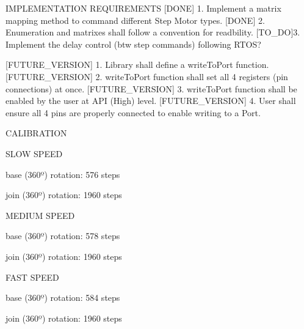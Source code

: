  I\+M\+P\+L\+E\+M\+E\+N\+T\+A\+T\+I\+ON R\+E\+Q\+U\+I\+R\+E\+M\+E\+N\+TS \mbox{[}D\+O\+NE\mbox{]} 1. Implement a matrix mapping method to command different Step Motor types. \mbox{[}D\+O\+NE\mbox{]} 2. Enumeration and matrixes shall follow a convention for readbility. \mbox{[}T\+O\+\_\+\+DO\mbox{]}3. Implement the delay control (btw step commands) following R\+T\+OS?

\mbox{[}F\+U\+T\+U\+R\+E\+\_\+\+V\+E\+R\+S\+I\+ON\mbox{]} 1. Library shall define a write\+To\+Port function. \mbox{[}F\+U\+T\+U\+R\+E\+\_\+\+V\+E\+R\+S\+I\+ON\mbox{]} 2. write\+To\+Port function shall set all 4 registers (pin connections) at once. \mbox{[}F\+U\+T\+U\+R\+E\+\_\+\+V\+E\+R\+S\+I\+ON\mbox{]} 3. write\+To\+Port function shall be enabled by the user at A\+PI (High) level. \mbox{[}F\+U\+T\+U\+R\+E\+\_\+\+V\+E\+R\+S\+I\+ON\mbox{]} 4. User shall ensure all 4 pins are properly connected to enable writing to a Port.

 C\+A\+L\+I\+B\+R\+A\+T\+I\+ON
\begin{DoxyEnumerate}
\item S\+L\+OW S\+P\+E\+ED
\end{DoxyEnumerate}
\begin{DoxyItemize}
\item base (360º) rotation\+: 576 steps
\item join (360º) rotation\+: 1960 steps
\end{DoxyItemize}
\begin{DoxyEnumerate}
\item M\+E\+D\+I\+UM S\+P\+E\+ED
\end{DoxyEnumerate}
\begin{DoxyItemize}
\item base (360º) rotation\+: 578 steps
\item join (360º) rotation\+: 1960 steps
\end{DoxyItemize}
\begin{DoxyEnumerate}
\item F\+A\+ST S\+P\+E\+ED
\end{DoxyEnumerate}
\begin{DoxyItemize}
\item base (360º) rotation\+: 584 steps
\item join (360º) rotation\+: 1960 steps 
\end{DoxyItemize}